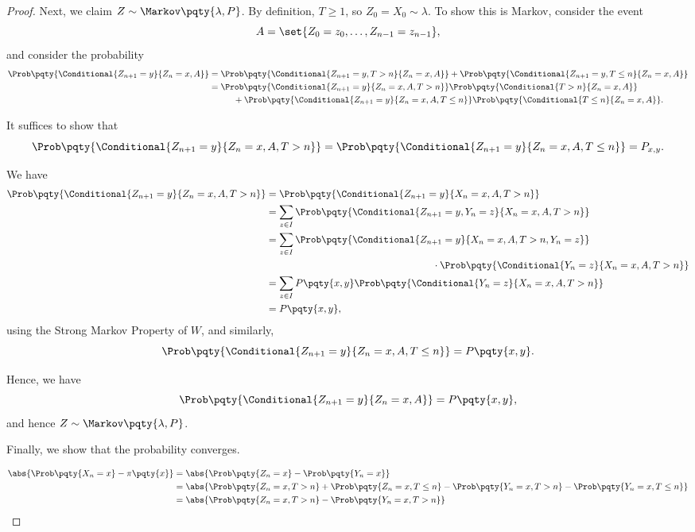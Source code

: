 \begin{proof}
    Next, we claim \(Z \sim \Markov\pqty{\lambda, P}\). By definition, \(T \geq 1\), so \(Z_0 = X_0 \sim \lambda\). To show this is Markov, consider the event
    \[
        A = \set{Z_0 = z_0, \ldots, Z_{n - 1} = z_{n - 1}},
    \]
    and consider the probability
    \begin{align*}
        \Prob\pqty{\Conditional{Z_{n + 1} = y}{Z_n = x, A}} &= \Prob\pqty{\Conditional{Z_{n + 1} = y, T > n}{Z_n = x, A}} + \Prob\pqty{\Conditional{Z_{n + 1} = y, T \leq n}{Z_n = x, A}} \\
        &= \Prob\pqty{\Conditional{Z_{n + 1} = y}{Z_n = x, A, T > n}} \Prob\pqty{\Conditional{T > n}{Z_n = x, A}} \\
        &\phantom{=} \qquad + \Prob\pqty{\Conditional{Z_{n + 1} = y}{Z_n = x, A, T \leq n}} \Prob\pqty{\Conditional{T \leq n}{Z_n = x, A}}.
    \end{align*}

    It suffices to show that
    \[
        \Prob\pqty{\Conditional{Z_{n + 1} = y}{Z_n = x, A, T > n}} = \Prob\pqty{\Conditional{Z_{n + 1} = y}{Z_n = x, A, T \leq n}} = P_{x, y}.
    \]

    We have
    \begin{align*}
        \Prob\pqty{\Conditional{Z_{n + 1} = y}{Z_n = x, A, T > n}} &= \Prob\pqty{\Conditional{Z_{n + 1} = y}{X_n = x, A, T > n}} \\
        &= \sum_{z \in I} \Prob\pqty{\Conditional{Z_{n + 1} = y, Y_n = z}{X_n = x, A, T > n}} \\
        &= \sum_{z \in I} \Prob\pqty{\Conditional{Z_{n + 1} = y}{X_n = x, A, T > n, Y_n = z}} \\
        &\phantom{=} \hspace{16em} \cdot \Prob\pqty{\Conditional{Y_n = z}{X_n = x, A, T > n}} \\
        &= \sum_{z \in I} P\pqty{x, y} \Prob\pqty{\Conditional{Y_n = z}{X_n = x, A, T > n}} \\
        &= P\pqty{x, y},
    \end{align*}
    using the Strong Markov Property of \(W\), and similarly,
    \[
        \Prob\pqty{\Conditional{Z_{n + 1} = y}{Z_n = x, A, T \leq n}} = P\pqty{x, y}.
    \]

    Hence, we have
    \[
        \Prob\pqty{\Conditional{Z_{n + 1} = y}{Z_n = x, A}} = P\pqty{x, y},
    \]
    and hence \(Z \sim \Markov\pqty{\lambda, P}\).

    Finally, we show that the probability converges.

    \begin{align*}
        \abs{\Prob\pqty{X_n = x} - \pi\pqty{x}} &= \abs{\Prob\pqty{Z_n = x} - \Prob\pqty{Y_n = x}} \\
        &= \abs{\Prob\pqty{Z_n = x, T > n} + \Prob\pqty{Z_n = x, T \leq n} - \Prob\pqty{Y_n = x, T > n} - \Prob\pqty{Y_n = x, T \leq n}} \\
        &= \abs{\Prob\pqty{Z_n = x, T > n} - \Prob\pqty{Y_n = x, T > n}} \\
    \end{align*}


\end{proof}
